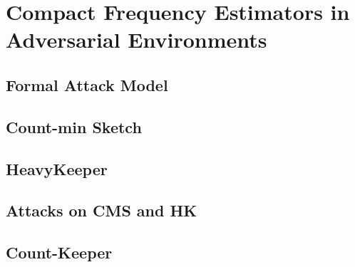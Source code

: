 \chapter{Compact Frequency Estimators in Adversarial Environments}

\section{Formal Attack Model}\label{sec:adv}



\section{Count-min Sketch}\label{sec:cms}
   
   

\section{HeavyKeeper}\label{sec:hk}
   
   

\section{Attacks on CMS and HK}\label{sec:attacks}


\section{Count-Keeper}\label{sec:ck}

